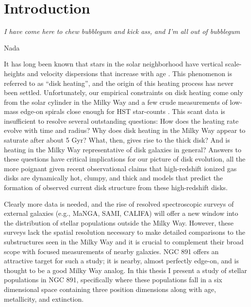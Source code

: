 \chapter[Introduction]{Introduction}
\label{chap:intro}
\epigraph{\fixspacing\emph{I have come here to chew bubblegum and kick
    ass, and I'm all out of bubblegum}}{Nada}


\clearpage It has long been known that stars in the solar neighborhood
have vertical scale-heights and velocity dispersions that increase
with age \citep[e.g.,][]{Wielen74}. This phenomenon is referred to as
``disk heating'', and the origin of this heating process has never
been settled. Unfortunately, our empirical constraints on disk heating
come only from the solar cylinder in the Milky Way and a few crude
measurements of low-mass edge-on spirals close enough for HST
star-counts \citep{Seth05a}. This scant data is insufficient to
resolve several outstanding questions: How does the heating rate
evolve with time and radius?  Why does disk heating in the Milky Way
appear to saturate after about 5 Gyr?  What, then, gives rise to the
thick disk?  And is heating in the Milky Way representative of disk
galaxies in general? Answers to these questions have critical
implications for our picture of disk evolution, all the more poignant
given recent observational claims that high-redshift ionized gas disks
are dynamically hot, clumpy, and thick \citep{Forster-Schreiber09} and
models \citep{Bird13} that predict the formation of observed current
disk structure from these high-redshift disks.

Clearly more data is needed, and the rise of resolved spectroscopic
surveys of external galaxies (e.g., MaNGA, SAMI, CALIFA) will offer a
new window into the distribution of stellar populations outside the
Milky Way. However, these surveys lack the spatial resolution
necessary to make detailed comparisons to the substructures seen in
the Milky Way and it is crucial to complement their broad scope with
focused measurements of nearby galaxies. NGC 891 offers an attractive
target for such a study; it is nearby, almost perfectly edge-on, and
is thought to be a good Milky Way analog. In this thesis I present a
study of stellar populations in NGC 891, specifically where these
populations fall in a six dimensional space containing three position
dimensions along with age, metallicity, and extinction.

